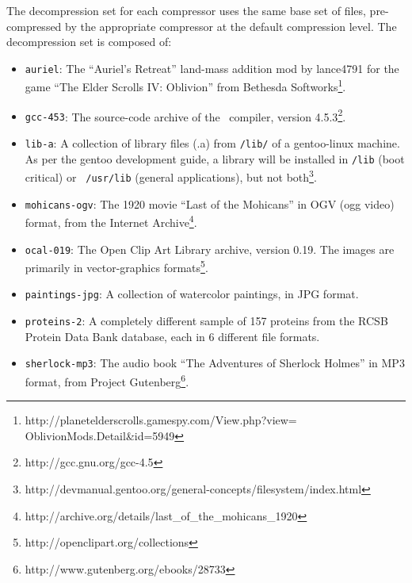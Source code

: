 The decompression set for each compressor uses the same base set of
files, pre-compressed by the appropriate compressor at the default
compression level.  The decompression set is composed of:
\begin{itemize}
\item {\tt auriel}: The ``Auriel's Retreat'' land-mass addition mod by
  lance4791 for the game ``The Elder Scrolls IV: Oblivion'' from
  Bethesda
  Softworks\footnote{http://planetelderscrolls.gamespy.com/View.php?view=\\ \hspace*{150 pt}OblivionMods.Detail\&id=5949}.

\item {\tt gcc-453}: The source-code archive of the \gcc\ compiler,
  version 4.5.3\footnote{http://gcc.gnu.org/gcc-4.5}.

\item {\tt lib-a}: A collection of library files (.a) from {\tt /lib/} of a
  gentoo-linux machine.  As per the gentoo development guide, a
  library will be installed in {\tt /lib} (boot critical) or {\tt
    /usr/lib} (general applications), but not both\footnote{
    http://devmanual.gentoo.org/general-concepts/filesystem/index.html}.

\item {\tt mohicans-ogv}: The 1920 movie ``Last of the Mohicans'' in OGV
  (ogg video) format, from the Internet
  Archive\footnote{http://archive.org/details/last\_of\_the\_mohicans\_1920}.

\item {\tt ocal-019}: The Open Clip Art Library archive, version 0.19.  The
  images are primarily in vector-graphics
  formats\footnote{http://openclipart.org/collections}.

\item {\tt paintings-jpg}: A collection of watercolor paintings, in JPG format.

\item {\tt proteins-2}: A completely different sample of 157 proteins from
  the RCSB Protein Data Bank database, each in 6 different file
  formats.

\item {\tt sherlock-mp3}: The audio book ``The Adventures of Sherlock
  Holmes'' in MP3 format, from Project
  Gutenberg\footnote{http://www.gutenberg.org/ebooks/28733}.

\end{itemize}
